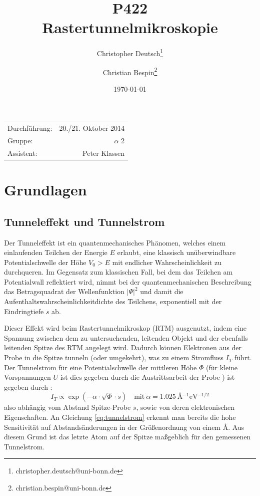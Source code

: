 \documentclass[10pt, a4paper]{article}
\title{P422 \\ Rastertunnelmikroskopie}
\author{Christopher Deutsch\footnote{christopher.deutsch@uni-bonn.de} \and Christian Bespin\footnote{christian.bespin@uni-bonn.de}}
\date{\today}
\begin{document}
  
\maketitle

\begin{center}
\begin{tabular}{l r}
Durchführung: & 20./21. Oktober 2014 \\
Gruppe: &$\alpha$ 2 \\
Assistent: & Peter Klassen
\end{tabular}
\end{center}

\begin{abstract}
\end{abstract}

\tableofcontents
\newpage

\section{Grundlagen}

\subsection{Tunneleffekt und Tunnelstrom}
Der Tunneleffekt ist ein quantenmechanisches Phänomen, welches einem einlaufenden Teilchen der Energie $E$ erlaubt, eine klassisch unüberwindbare Potentialschwelle der Höhe $V_0 > E$ mit endlicher Wahrscheinlichkeit zu durchqueren.
Im Gegensatz zum klassischen Fall, bei dem das Teilchen am Potentialwall reflektiert wird, nimmt bei der quantenmechanischen Beschreibung das Betragsquadrat der Wellenfunktion $|\Psi|^2$ und damit die Aufenthaltswahrscheinlichkeitdichte des Teilchens, exponentiell mit der Eindringtiefe $s$ ab.

Dieser Effekt wird beim Rastertunnelmikroskop (RTM) ausgenutzt, indem eine Spannung zwischen dem zu untersuchenden, leitenden Objekt und der ebenfalls leitenden Spitze des RTM angelegt wird. Dadurch können Elektronen aus der Probe in die Spitze tunneln (oder umgekehrt), was zu einem Stromfluss $I_T$ führt.
Der Tunnelstrom für eine Potentialschwelle der mittleren Höhe $\Phi$ (für kleine Vorspannungen $U$ ist dies gegeben durch die Austrittsarbeit der Probe \cite{colton}) ist gegeben durch \cite{binning}:
\begin{equation}
  I_T \propto \exp(-\alpha \cdot \sqrt{\Phi} \cdot s) \quad \text{mit}\: \alpha = \SI{1,025}{\angstrom^{-1}\electronvolt^{-1/2}}
  \label{eq:tunnelstrom}
\end{equation}
also abhängig vom Abstand Spitze-Probe $s$, sowie von deren elektronischen Eigenschaften.
An Gleichung \ref{eq:tunnelstrom} erkennt man bereits die hohe Sensitivität auf Abstandsänderungen in der Größenordnung von einem \si{\angstrom}.
Aus diesem Grund ist das letzte Atom auf der Spitze maßgeblich für den gemessenen Tunnelstrom.
\end{document}
